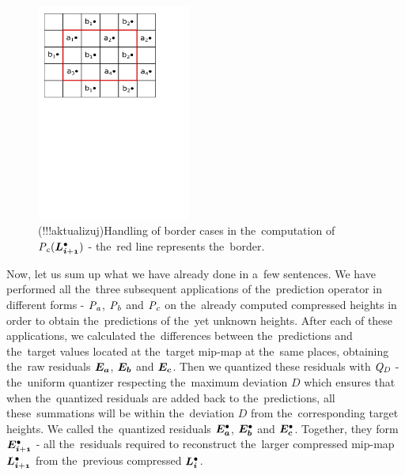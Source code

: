 \begin{figure}
	\includegraphics[trim={0 17cm 3cm 0}, clip, width=0.45\textwidth]{figures/extc.pdf}\centering
	\caption{(!!!aktualizuj)Handling of border cases in the~computation of $\opnorm{P}{c}(\ldot{i+1})$ - the~red line represents the~border.}
	\label{fig:cborders}
\end{figure}

Now, let us sum up what we have already done in a~few sentences. We have performed all the~three subsequent applications of the~prediction operator in different forms - $\mathit{P_{a}}$, $\mathit{P_{b}}$ and $\mathit{P_{c}}$ on the~already computed compressed heights in order to obtain the~predictions of the~yet unknown heights. After each of these applications, we calculated the~differences between the~predictions and the~target values located at the~target mip-map at the~same places, obtaining the~raw residuals $\objnorm{E}{a}$, $\objnorm{E}{b}$ and $\objnorm{E}{c}$. Then we quantized these residuals with $\mathit{Q_{D}}$ - the~uniform quantizer respecting the~maximum deviation $D$ which ensures that when the~quantized residuals are added back to the~predictions, all these~summations will be within the~deviation $D$ from the~corresponding target heights. We called the~quantized residuals $\objdot{E}{a}$, $\objdot{E}{b}$ and $\objdot{E}{c}$. Together, they form $\objdot{E}{i+1}$ - all the~residuals required to reconstruct the~larger compressed mip-map $\ldot{i+1}$ from the~previous compressed $\ldot{i}$.

